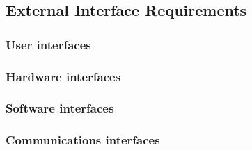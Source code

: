 \subsection{External Interface Requirements}

\subsubsection{User interfaces}
\subsubsection{Hardware interfaces}
\subsubsection{Software interfaces}
\subsubsection{Communications interfaces}